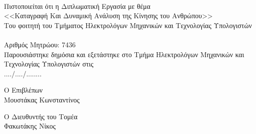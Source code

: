 \thispagestyle{empty}
\newpage

\thispagestyle{empty}
\clearpage\mbox{}\clearpage

\begin{center}
    {}\\[1cm]
    Πιστοποιείται ότι η Διπλωματική Εργασία με θέμα\\[0.5cm]
    <<Καταγραφή Και Δυναμική Ανάλυση της Κίνησης του Ανθρώπου>>\\[1cm]
    Του φοιτητή του Τμήματος Ηλεκτρολόγων Μηχανικών και Τεχνολογίας Υπολογιστών\\[0.5cm]
    \\[10pt]
    Αριθμός Μητρώου: 7436\\[2cm]
    Παρουσιάστηκε δημόσια και εξετάστηκε στο Τμήμα Ηλεκτρολόγων Μηχανικών και Τεχνολογίας Υπολογιστών στις\\
    ..../..../........\\[9cm]
\end{center}

\begin{minipage}[t]{0.5\textwidth}
    \begin{flushleft}
        Ο Επιβλέπων\\
        Μουστάκας Κωνσταντίνος
    \end{flushleft}
\end{minipage}%
\begin{minipage}[t]{0.5\textwidth}
    \begin{flushright}
        Ο Διευθυντής του Τομέα\\
        Φακωτάκης Νίκος
    \end{flushright}
\end{minipage}%

\thispagestyle{empty}
\newpage
\clearpage\mbox{}
\thispagestyle{empty}
\clearpage
